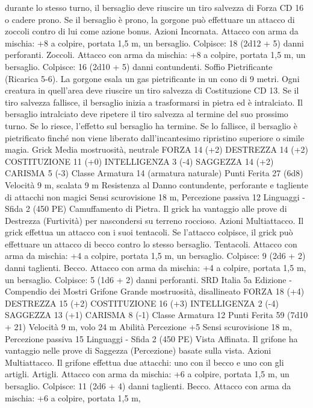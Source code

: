 \begin{multicols}{2}
durante lo stesso turno, il bersaglio deve riuscire un tiro salvezza di
Forza CD 16 o cadere prono. Se il bersaglio è prono, la gorgone può
effettuare un attacco di zoccoli contro di lui come azione bonus.
Azioni
Incornata. Attacco con arma da mischia: +8 a colpire, portata
1,5 m, un bersaglio.
Colpisce: 18 (2d12 + 5) danni perforanti.
Zoccoli. Attacco con arma da mischia: +8 a colpire, portata 1,5
m, un bersaglio.
Colpisce: 16 (2d10 + 5) danni contundenti.
Soffio Pietrificante (Ricarica 5-6). La gorgone esala un gas
pietrificante in un cono di 9 metri. Ogni creatura in quell’area
deve riuscire un tiro salvezza di Costituzione CD 13. Se il tiro
salvezza fallisce, il bersaglio inizia a trasformarsi in pietra ed è
intralciato. Il bersaglio intralciato deve ripetere il tiro salvezza al
termine del suo prossimo turno. Se lo riesce, l’effetto sul
bersaglio ha termine. Se lo fallisce, il bersaglio è pietrificato
finché non viene liberato dall’incantesimo ripristino superiore o
simile magia.
Grick
Media mostruosità, neutrale
FORZA 14 (+2)
DESTREZZA 14 (+2)
COSTITUZIONE 11 (+0)
INTELLIGENZA 3 (-4)
SAGGEZZA 14 (+2)
CARISMA 5 (-3)
Classe Armatura 14 (armatura naturale)
Punti Ferita 27 (6d8)
Velocità 9 m, scalata 9 m
Resistenza al Danno contundente, perforante e tagliente di
attacchi non magici
Sensi scurovisione 18 m, Percezione passiva 12
Linguaggi -
Sfida 2 (450 PE)
Camuffamento di Pietra. Il grick ha vantaggio alle prove di
Destrezza (Furtività) per nascondersi su terreno roccioso.
Azioni
Multiattacco. Il grick effettua un attacco con i suoi tentacoli. Se
l’attacco colpisce, il grick può effettuare un attacco di becco
contro lo stesso bersaglio.
Tentacoli. Attacco con arma da mischia: +4 a colpire, portata 1,5
m, un bersaglio.
Colpisce: 9 (2d6 + 2) danni taglienti.
Becco. Attacco con arma da mischia: +4 a colpire, portata 1,5 m,
un bersaglio.
Colpisce: 5 (1d6 + 2) danni perforanti.
SRD Italia 5a Edizione - Compendio dei Mostri
Grifone
Grande mostruosità, disallineato
FORZA 18 (+4)
DESTREZZA 15 (+2)
COSTITUZIONE 16 (+3)
INTELLIGENZA 2 (-4)
SAGGEZZA 13 (+1)
CARISMA 8 (-1)
Classe Armatura 12
Punti Ferita 59 (7d10 + 21)
Velocità 9 m, volo 24 m
Abilità Percezione +5
Sensi scurovisione 18 m, Percezione passiva 15
Linguaggi -
Sfida 2 (450 PE)
Vista Affinata. Il grifone ha vantaggio nelle prove di Saggezza
(Percezione) basate sulla vista.
Azioni
Multiattacco. Il grifone effettua due attacchi: uno con il becco e
uno con gli artigli.
Artigli. Attacco con arma da mischia: +6 a colpire, portata 1,5
m, un bersaglio.
Colpisce: 11 (2d6 + 4) danni taglienti.
Becco. Attacco con arma da mischia: +6 a colpire, portata 1,5 m,

\end{multicols}
